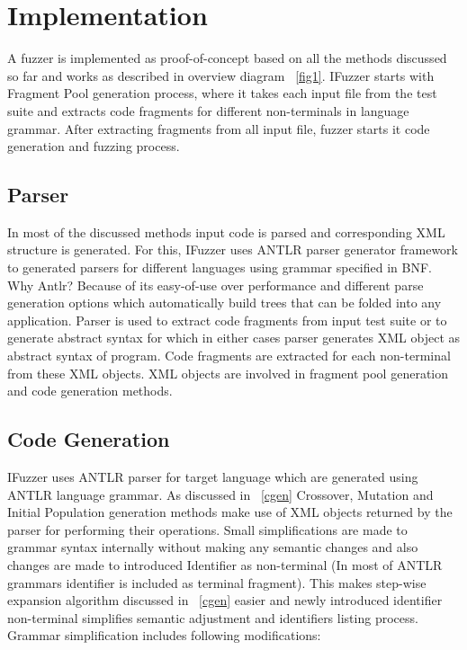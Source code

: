 \documentclass{acm_proc_article-sp}
\begin{document}
\section{Implementation} \label{impl}
A fuzzer is implemented as proof-of-concept based on all the methods discussed so far and works as described in overview diagram ~\autoref{fig1}. IFuzzer starts with Fragment Pool generation process, where it takes each input file from the test suite and extracts code fragments for different non-terminals in language grammar.
After extracting fragments from all input file, fuzzer starts it code generation and fuzzing process. 

\subsection{Parser}
In most of the discussed methods input code is parsed and corresponding XML structure is generated. For this, IFuzzer uses ANTLR parser generator framework \cite{Parr13} to generated parsers for different languages using grammar specified in BNF. Why Antlr? Because of its easy-of-use over performance and different parse generation options which automatically build trees that can be folded into any application. Parser is used to extract code fragments from input test suite or to generate abstract syntax for which in either cases parser generates XML object as abstract syntax of program. Code fragments are extracted for each non-terminal from these XML objects. XML objects are involved in fragment pool generation and code generation methods.

\subsection{Code Generation}
IFuzzer uses ANTLR parser for target language which are generated using ANTLR language grammar. As discussed in ~\autoref{cgen} Crossover, Mutation and Initial Population generation methods make use of XML objects returned by the parser for performing their operations. Small simplifications are made to grammar syntax internally without making any semantic changes and also changes are made to introduced Identifier as non-terminal (In most of ANTLR grammars identifier is included as terminal fragment). This makes step-wise expansion algorithm discussed in ~\autoref{cgen} easier and newly introduced identifier non-terminal simplifies semantic adjustment and identifiers listing process. \\
Grammar simplification includes following modifications:
\end{document}
